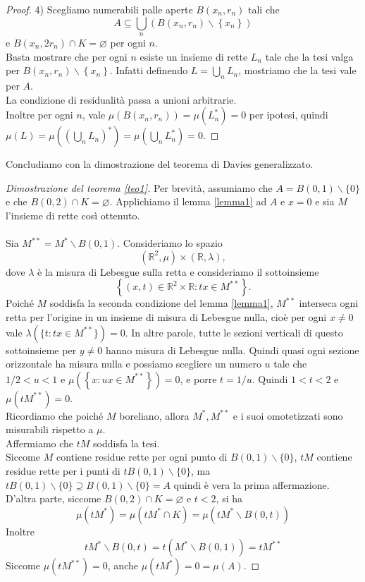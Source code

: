 \documentclass[a4paper, twoside]{article}
\newcommand{\<}{\langle}
\renewcommand{\>}{\rangle}
\begin{document}
\begin{proof}
	4) Scegliamo numerabili palle aperte $B\left(x_{n}, r_{n}\right)$ tali che
	$$ A \subseteq \bigcup_{n}\left(B\left(x_{n}, r_{n}\right) \backslash\left\{x_{n}\right\}\right)$$
	e $B\left(x_{n}, 2 r_{n}\right) \cap K=\varnothing$ per ogni $n$.\\
	Basta mostrare che per ogni $n$ esiste un insieme di rette $L_{n}$ tale che la tesi valga per $B\left(x_{n}, r_{n}\right) \backslash\left\{x_{n}\right\}$. Infatti definendo $L=\bigcup_n L_n$, mostriamo che la tesi vale per $A$.\\
	La condizione di residualità passa a unioni arbitrarie.\\
	Inoltre per ogni $n$, vale $\mu(B(x_n,r_n))=\mu(L_n^*)=0$ per ipotesi, quindi $\mu(L)=\mu((\bigcup_nL_n)^*) = \mu(\bigcup_n L_n^*)=0$.
	
	\end{proof}

Concludiamo con la dimostrazione del teorema di Davies generalizzato.

\begin{proof}[Dimostrazione del teorema \ref{teo1}]
	
Per brevità, assumiamo che $A=B(0,1) \backslash\{0\}$ e che $B(0,2) \cap K=\varnothing$. Applichiamo il lemma \ref{lemma1} ad $A$ e $x=0$ e sia $M$ l'insieme di rette così ottenuto.\\
\hfill \\
Sia $M^{* *}=M^{*} \backslash B(0,1)$. Consideriamo lo spazio
$$
\left(\mathbb{R}^{2}, \mu\right) \times(\mathbb{R}, \lambda),
$$
dove $\lambda$ è la misura di Lebesgue sulla retta e consideriamo il sottoinsieme
$$
\left\{(x, t) \in \mathbb{R}^{2} \times \mathbb{R}: t x \in M^{* *}\right\} .
$$
Poiché $M$ soddisfa la seconda condizione del lemma \ref{lemma1}, $M^{**}$ interseca ogni retta per l'origine in un insieme di misura di Lebesgue nulla, cioè per ogni $x \neq 0$ vale $\lambda(\{t: tx \in M^{**}\})=0$. In altre parole, tutte le sezioni verticali di questo sottoinsieme per $y\neq 0$  hanno misura di Lebesgue nulla. Quindi quasi ogni sezione orizzontale ha misura nulla e possiamo scegliere un numero $u$ tale che $1 / 2<u<1$ e $\mu\left(\left\{x: u x \in M^{* *}\right\}\right)=0$, e porre $t=1 / u$. Quindi $1<t<2$ e $\mu\left(t M^{* *}\right)=0$.\\
Ricordiamo che poiché $M$ boreliano, allora $M^*, M^{**}$ e i suoi omotetizzati sono misurabili rispetto a $\mu$.\\
Affermiamo che $t M$ soddisfa la tesi.\\
Siccome $M$ contiene residue rette per ogni punto di $B(0,1) \backslash\{0\}$, $t M$ contiene residue rette per i punti di $t B(0,1) \backslash\{0\}$, ma $t B(0,1) \backslash\{0\} \supseteq B(0,1) \backslash\{0\}=A$ quindi è vera la prima affermazione.\\
D'altra parte, siccome $B(0,2) \cap K=\varnothing$ e $t<2$, si ha
$$
\mu\left(t M^{*}\right)=\mu\left(t M^{*} \cap K\right)=\mu\left(t M^{*} \backslash B(0, t)\right)
$$
Inoltre
$$
t M^{*} \backslash B(0, t)=t\left(M^{*} \backslash B(0,1)\right)=t M^{* *}
$$
Siccome $\mu\left(t M^{* *}\right)=0$, anche $\mu (tM^*)= 0= \mu(A)$.

\end{proof}
\end{document}
